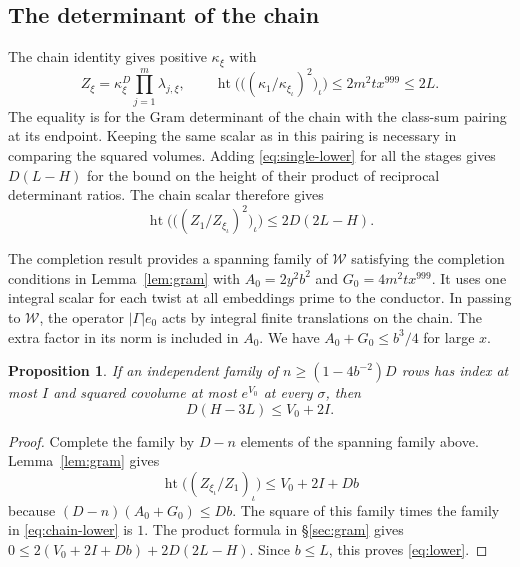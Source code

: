\documentclass[11pt,reqno]{amsart}
\newtheorem{proposition}[theorem]{Proposition}
\theoremstyle{definition}
\numberwithin{equation}{section}
\newcommand{\htle}[2]{\operatorname{ht}\bigl(#1\bigr)\le #2}
\begin{document}
\subsection{The determinant of the chain}

The chain identity \cite[{\rm(13.55)}]{chojecki} gives positive
\(\kappa_\xi\) with
\[
 Z_\xi=\kappa_\xi^D\prod_{j=1}^m\lambda_{j,\xi},
 \qquad
 \htle{\bigl((\kappa_1/\kappa_{\xi_\iota})^2\bigr)_\iota}
       {2m^2t x^{999}}\le 2L .
\]
The equality is for the Gram determinant of the chain with
the class-sum pairing at its endpoint. Keeping the same scalar
as in this pairing is necessary in comparing the squared volumes.
Adding \eqref{eq:single-lower} for all the stages gives
\(D(L-H)\) for the bound on the height of their product of
reciprocal determinant ratios. The chain scalar therefore gives
\begin{equation}\label{eq:chain-lower}
 \htle{\bigl((Z_1/Z_{\xi_\iota})^2\bigr)_\iota}{2D(2L-H)} .
\end{equation}

The completion result \cite[Proposition~13.34]{chojecki}
provides a spanning family of \(\mathcal W\) satisfying the
completion conditions in Lemma~\ref{lem:gram} with
\(A_0=2y^2b^2\) and \(G_0=4m^2t x^{999}\).
It uses one integral scalar for each twist at all embeddings
prime to the conductor. In passing to \(\mathcal W\), the
operator \(|\Gamma|e_0\) acts by integral finite translations
on the chain. The extra factor in its norm is included in
\(A_0\). We have \(A_0+G_0\le b^3/4\) for large \(x\).

\begin{proposition}\label{prop:long}
If an independent family of \(n\ge(1-4b^{-2})D\) rows has
index at most \(I\) and squared covolume at most \(e^{V_0}\)
at every \(\sigma\), then
\begin{equation}\label{eq:lower}
 D(H-3L)\le V_0+2I.
\end{equation}
\end{proposition}

\begin{proof}
Complete the family by \(D-n\) elements of the spanning
family above. Lemma~\ref{lem:gram} gives
\[
 \htle{(Z_{\xi_\iota}/Z_1)_\iota}{V_0+2I+Db}
\]
because \((D-n)(A_0+G_0)\le Db\).
The square of this family times the family in
\eqref{eq:chain-lower} is \(1\). The product formula in
\S\ref{sec:gram} gives
\(0\le 2(V_0+2I+Db)+2D(2L-H)\).
Since \(b\le L\), this proves \eqref{eq:lower}.
\end{proof}
\end{document}

